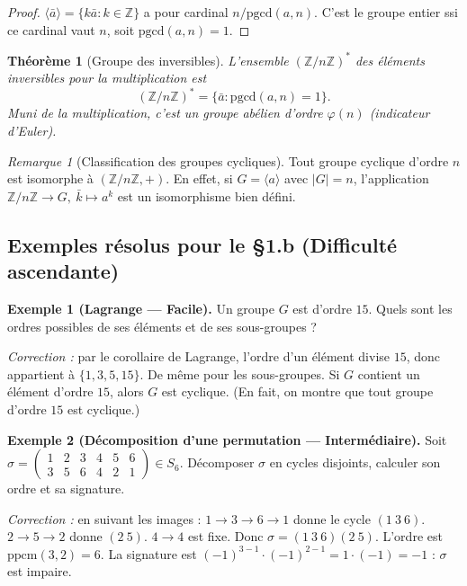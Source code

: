 \documentclass[12pt,a4paper]{report}
\newtheorem{theoreme}{Théorème}[section]
\theoremstyle{definition}
\theoremstyle{remark}
\newtheorem{remarque}{Remarque}[section]
\begin{document}
\begin{proof}
$\langle \bar{a} \rangle = \{k \bar{a} : k \in \mathbb{Z}\}$ a pour cardinal $n / \mathrm{pgcd}(a, n)$. C'est le groupe entier ssi ce cardinal vaut $n$, soit $\mathrm{pgcd}(a, n) = 1$.
\end{proof}

\begin{theoreme}[Groupe des inversibles]
L'ensemble $(\mathbb{Z}/n\mathbb{Z})^*$ des éléments inversibles pour la multiplication est
\[ (\mathbb{Z}/n\mathbb{Z})^* = \{\bar{a} : \mathrm{pgcd}(a, n) = 1\}. \]
Muni de la multiplication, c'est un groupe abélien d'ordre $\varphi(n)$ (indicateur d'Euler).
\end{theoreme}

\begin{remarque}[Classification des groupes cycliques]
Tout groupe cyclique d'ordre $n$ est isomorphe à $(\mathbb{Z}/n\mathbb{Z}, +)$. En effet, si $G = \langle a \rangle$ avec $|G| = n$, l'application $\mathbb{Z}/n\mathbb{Z} \to G,\ \bar{k} \mapsto a^k$ est un isomorphisme bien défini.
\end{remarque}

\subsection{Exemples résolus pour le §1.b (Difficulté ascendante)}

\textbf{Exemple 1 (Lagrange --- Facile).}
Un groupe $G$ est d'ordre $15$. Quels sont les ordres possibles de ses éléments et de ses sous-groupes ?

\textit{Correction :} par le corollaire de Lagrange, l'ordre d'un élément divise $15$, donc appartient à $\{1, 3, 5, 15\}$. De même pour les sous-groupes. Si $G$ contient un élément d'ordre $15$, alors $G$ est cyclique. (En fait, on montre que tout groupe d'ordre $15$ est cyclique.)

\medskip

\textbf{Exemple 2 (Décomposition d'une permutation --- Intermédiaire).}
Soit $\sigma = \begin{pmatrix} 1 & 2 & 3 & 4 & 5 & 6 \\ 3 & 5 & 6 & 4 & 2 & 1 \end{pmatrix} \in S_6$. Décomposer $\sigma$ en cycles disjoints, calculer son ordre et sa signature.

\textit{Correction :} en suivant les images : $1 \to 3 \to 6 \to 1$ donne le cycle $(1\ 3\ 6)$. $2 \to 5 \to 2$ donne $(2\ 5)$. $4 \to 4$ est fixe. Donc $\sigma = (1\ 3\ 6)(2\ 5)$.
L'ordre est $\mathrm{ppcm}(3, 2) = 6$. La signature est $(-1)^{3-1} \cdot (-1)^{2-1} = 1 \cdot (-1) = -1$ : $\sigma$ est impaire.
\end{document}
